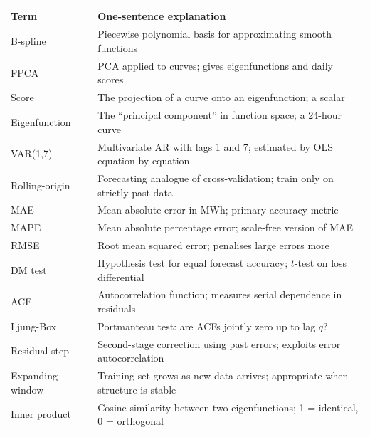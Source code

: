 \documentclass[11pt,a4paper]{article}
\begin{document}
\begin{tabular}{p{}p{}}
\toprule
\textbf{Term} & \textbf{One-sentence explanation} \\
\midrule
B-spline & Piecewise polynomial basis for approximating smooth functions \\
FPCA & PCA applied to curves; gives eigenfunctions and daily scores \\
Score & The projection of a curve onto an eigenfunction; a scalar \\
Eigenfunction & The ``principal component'' in function space; a 24-hour curve \\
VAR(1,7) & Multivariate AR with lags 1 and 7; estimated by OLS equation by equation \\
Rolling-origin & Forecasting analogue of cross-validation; train only on strictly past data \\
MAE & Mean absolute error in MWh; primary accuracy metric \\
MAPE & Mean absolute percentage error; scale-free version of MAE \\
RMSE & Root mean squared error; penalises large errors more \\
DM test & Hypothesis test for equal forecast accuracy; $t$-test on loss differential \\
ACF & Autocorrelation function; measures serial dependence in residuals \\
Ljung-Box & Portmanteau test: are ACFs jointly zero up to lag $q$? \\
Residual step & Second-stage correction using past errors; exploits error autocorrelation \\
Expanding window & Training set grows as new data arrives; appropriate when structure is stable \\
Inner product & Cosine similarity between two eigenfunctions; 1 = identical, 0 = orthogonal \\
\bottomrule
\end{tabular}
\end{document}
